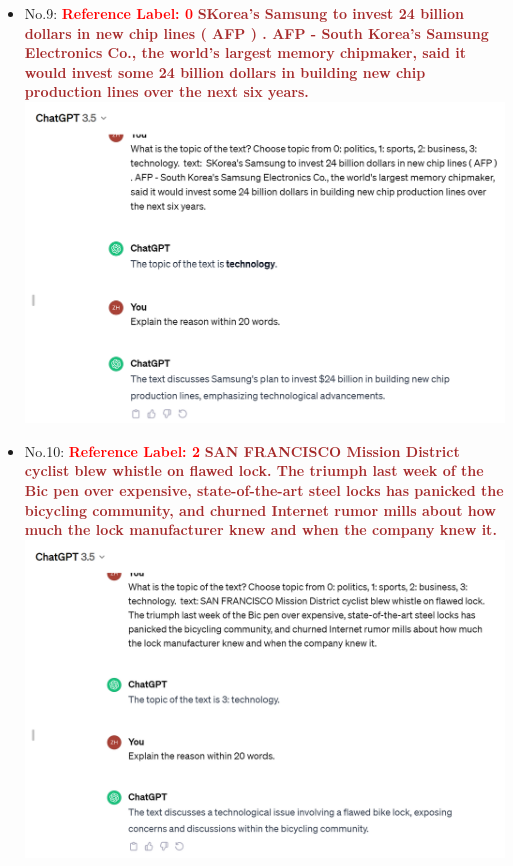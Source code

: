 \documentclass{article}
\begin{document}
\begin{itemize}
    \item No.9: \textcolor{red}{\textbf{Reference Label: 0}}
    \textcolor{brown}{\textbf{SKorea's Samsung to invest 24 billion dollars in new chip lines ( AFP ) . AFP - South Korea's Samsung Electronics Co., the world's largest memory chipmaker, said it would invest some 24 billion dollars in building new chip production lines over the next six years.  }}\\
    \includegraphics[width=\textwidth]{Q9.png}
    \item No.10: \textcolor{red}{\textbf{Reference Label: 2}}
    \textcolor{brown}{\textbf{SAN FRANCISCO Mission District cyclist blew whistle on flawed lock. The triumph last week of the Bic pen over expensive, state-of-the-art steel locks has panicked the bicycling community, and churned Internet rumor mills about how much the lock manufacturer knew and when the company knew it.}}\\
    \includegraphics[width=\textwidth]{Q10.png}
\end{itemize} 
\end{document}
